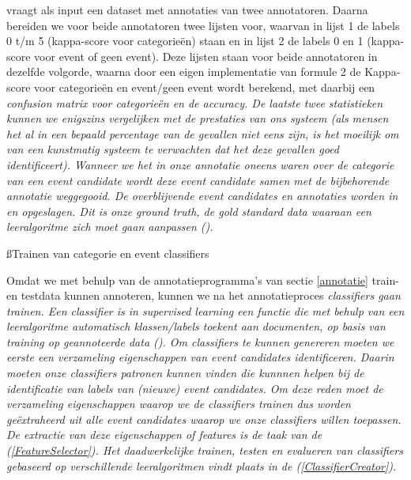{{ vraagt als input een dataset met annotaties van twee 
annotatoren. Daarna bereiden we voor beide annotatoren twee lijsten voor, 
waarvan in lijst 1 de labels 0 t/m 5 (kappa-score voor categorie\"en) staan en in 
lijst 2 de labels 0 en 1 (kappa-score voor event of geen event). Deze lijsten 
staan voor beide annotatoren in dezelfde volgorde, waarna door een eigen 
implementatie van formule 2 de Kappa-score voor categorie\"en en event/geen event 
wordt berekend, met daarbij een \it{confusion matrix} voor categorieën en de 
\it{accuracy}. De laatste twee statistieken kunnen we enigszins vergelijken met de prestaties van 
ons systeem (als mensen het al in een bepaald percentage van de gevallen niet 
eens zijn, is het moeilijk om van een kunstmatig systeem te verwachten dat het 
deze gevallen goed identificeert).
\vl
Wanneer we het in onze annotatie oneens waren over de categorie van een event 
candidate wordt deze event candidate samen met de bijbehorende annotatie 
weggegooid. De overblijvende event candidates en annotaties worden in 
 en 
 opgeslagen. Dit is onze \it{ground truth}, 
de \it{gold standard data} waaraan een leeralgoritme zich moet gaan aanpassen 
(\citealt{kobielus2014}).

\ss{Trainen van categorie en event classifiers}\label{train}

Omdat we met behulp van de annotatieprogramma's van sectie \ref{annotatie} train- en 
testdata kunnen annoteren, kunnen we na het annotatieproces \it{classifiers} gaan 
trainen. Een \it{classifier} is in supervised learning een functie die met behulp van 
een leeralgoritme automatisch klassen/labels toekent aan documenten, op basis 
van training op geannoteerde data (\citealt{manning2008introduction}). Om classifiers te kunnen 
genereren moeten we eerste een verzameling eigenschappen van event candidates 
identificeren. Daarin moeten onze classifiers patronen kunnen vinden die kunnnen 
helpen bij de identificatie van labels van (nieuwe) event candidates. Om deze 
reden moet de verzameling eigenschappen waarop we de classifiers trainen dus 
worden geëxtraheerd uit alle event candidates waarop we onze classifiers willen 
toepassen. De extractie van deze eigenschappen of features is de taak van de 
 (\ref{FeatureSelector}). Het daadwerkelijke trainen, testen en evalueren van 
classifiers gebaseerd op verschillende leeralgoritmen vindt plaats in de 
 (\ref{ClassifierCreator}).

}}
